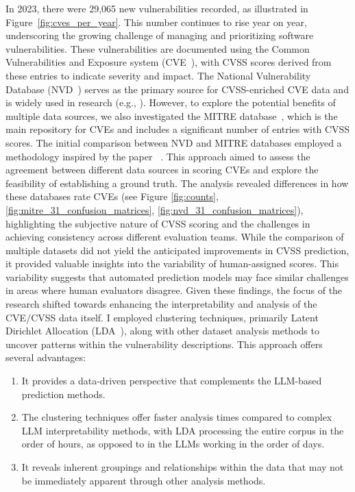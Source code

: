 \documentclass[12pt]{article}
\begin{document}
In 2023, there were 29,065 new vulnerabilities recorded, as illustrated in Figure~\ref{fig:cves_per_year}.
This number continues to rise year on year, underscoring the growing challenge of managing and
prioritizing software vulnerabilities. These vulnerabilities are documented using the Common
Vulnerabilities and Exposure system (CVE~\cite{CVE}), with CVSS scores derived from these entries to
indicate severity and impact. The National Vulnerability Database (NVD~\cite{NVD}) serves as the
primary source for CVSS-enriched CVE data and is widely used in research (e.g., \cite{costa,
	nvd_example1, nvd_example2}). However, to explore the potential benefits of multiple data sources,
we also investigated the MITRE database~\cite{MITRE}, which is the main repository for CVEs and
includes a significant number of entries with CVSS scores. The initial comparison between NVD and
MITRE databases employed a methodology inspired by the paper ~\cite{bayes}. This approach aimed to assess the
agreement between different data sources in scoring CVEs and explore the feasibility of establishing
a ground truth. The analysis revealed differences in how these databases rate CVEs (see Figure
\ref{fig:counts}, \ref{fig:mitre_31_confusion_matrices}, \ref{fig:nvd_31_confusion_matrices}), highlighting the subjective nature of CVSS scoring and the challenges in
achieving consistency across different evaluation teams. While the comparison of multiple datasets
did not yield the anticipated improvements in CVSS prediction, it provided valuable insights into
the variability of human-assigned scores. This variability suggests that automated prediction models
may face similar challenges in areas where human evaluators disagree. Given these findings, the
focus of the research shifted towards enhancing the interpretability and analysis of the CVE/CVSS
data itself. I employed clustering techniques, primarily Latent Dirichlet Allocation
(LDA~\cite{lda_origin}), along with other dataset analysis methods to uncover patterns within the
vulnerability descriptions. This approach offers several advantages:

\begin{enumerate}

	\item It provides a data-driven perspective that complements the LLM-based prediction methods.

	\item The clustering techniques offer faster analysis times compared to complex LLM interpretability
	      methods, with LDA processing the entire corpus in the order of hours, as opposed to in
	      the LLMs working in the order of days.

	\item It reveals inherent groupings and relationships within the data that may not be immediately apparent
	      through other analysis methods.

\end{enumerate}
\end{document}
